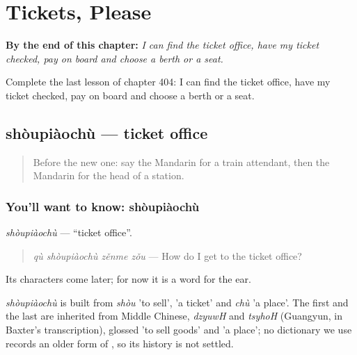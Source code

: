 
\chapter{Tickets, Please}
\label{ch:zh-tickets-please}

\begin{chapteropening}
\textbf{By the end of this chapter:} \emph{I can find the ticket office, have my ticket checked, pay on board and choose a berth or a seat.}

Complete the last lesson of chapter 404: I can find the ticket office, have my ticket checked, pay on board and choose a berth or a seat.
\end{chapteropening}

\section[shòupiàochù]{shòupiàochù — ticket office}

\label{lesson:ZH-C404-shoupiaochu}



\begin{quote}
Before the new one: say the Mandarin for a train attendant, then the Mandarin for the head of a station.
\end{quote}

\subsection*{You'll want to know: shòupiàochù}
\emph{shòupiàochù} — \textquotedblleft{}ticket office\textquotedblright{}.

\begin{quote}
\emph{qù shòupiàochù zěnme zǒu} — How do I get to the ticket office?
\end{quote}

Its characters come later; for now it is a word for the ear.

\begin{cousinweb}
\emph{shòupiàochù} is built from \emph{shòu} 'to sell',  'a ticket' and \emph{chù} 'a place'. The first and the last are inherited from Middle Chinese, \emph{dzyuwH} and \emph{tsyhoH} (Guangyun, in Baxter's transcription), glossed 'to sell goods' and 'a place'; no dictionary we use records an older form of , so its history is not settled.
\end{cousinweb}


